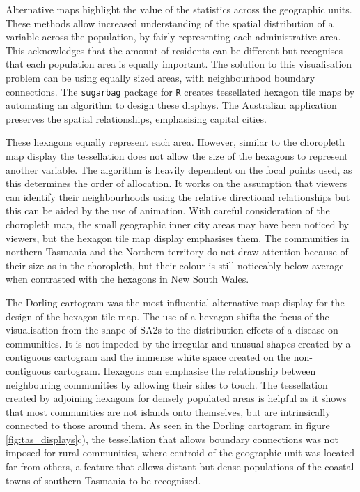 Alternative maps highlight the value of the statistics across the
geographic units. These methods allow increased understanding of the
spatial distribution of a variable across the population, by fairly
representing each administrative area. This acknowledges that the amount
of residents can be different but recognises that each population area
is equally important. The solution to this visualisation problem can be
using equally sized areas, with neighbourhood boundary connections. The
\texttt{sugarbag} package for \texttt{R} creates tessellated hexagon
tile maps by automating an algorithm to design these displays. The
Australian application preserves the spatial relationships, emphasising
capital cities.

These hexagons equally represent each area. However, similar to the
choropleth map display the tessellation does not allow the size of the
hexagons to represent another variable. The algorithm is heavily
dependent on the focal points used, as this determines the order of
allocation. It works on the assumption that viewers can identify their
neighbourhoods using the relative directional relationships but this can
be aided by the use of animation. With careful consideration of the
choropleth map, the small geographic inner city areas may have been
noticed by viewers, but the hexagon tile map display emphasises them.
The communities in northern Tasmania and the Northern territory do not
draw attention because of their size as in the choropleth, but their
colour is still noticeably below average when contrasted with the
hexagons in New South Wales.

The Dorling cartogram was the most influential alternative map display
for the design of the hexagon tile map. The use of a hexagon shifts the
focus of the visualisation from the shape of SA2s to the distribution
effects of a disease on communities. It is not impeded by the irregular
and unusual shapes created by a contiguous cartogram and the immense
white space created on the non-contiguous cartogram. Hexagons can
emphasise the relationship between neighbouring communities by allowing
their sides to touch. The tessellation created by adjoining hexagons for
densely populated areas is helpful as it shows that most communities are
not islands onto themselves, but are intrinsically connected to those
around them. As seen in the Dorling cartogram in figure
\ref{fig:tas_displays}c), the tessellation that allows boundary
connections was not imposed for rural communities, where centroid of the
geographic unit was located far from others, a feature that allows
distant but dense populations of the coastal towns of southern Tasmania
to be recognised.


